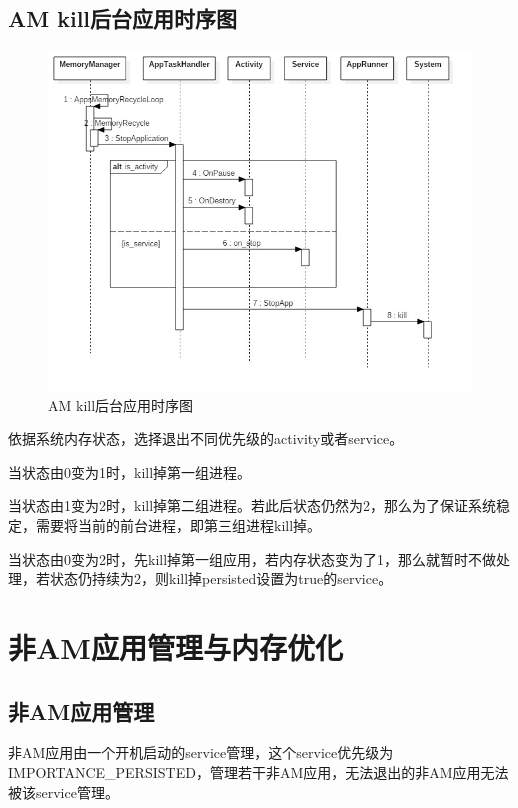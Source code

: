 \subsection{AM kill后台应用时序图}
\begin{figure}[H]
  \centering
  \includegraphics[width=\textwidth]{image/tbrw2_app_optimization/png/kill_progress.jpg}
  \caption{AM kill后台应用时序图}
\end{figure}
依据系统内存状态，选择退出不同优先级的activity或者service。\par
当状态由0变为1时，kill掉第一组进程。\par
当状态由1变为2时，kill掉第二组进程。若此后状态仍然为2，那么为了保证系统稳定，需要将当前的前台进程，即第三组进程kill掉。\par
当状态由0变为2时，先kill掉第一组应用，若内存状态变为了1，那么就暂时不做处理，若状态仍持续为2，则kill掉persisted设置为true的service。\par

\section{非AM应用管理与内存优化}
\subsection{非AM应用管理}
非AM应用由一个开机启动的service管理，这个service优先级为IMPORTANCE\_PERSISTED，管理若干非AM应用，无法退出的非AM应用无法被该service管理。

